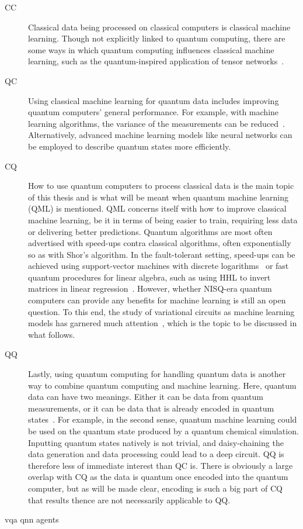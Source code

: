\begin{description}
    \item[CC]
        Classical data being processed on classical computers is classical machine learning.
        Though not explicitly linked to quantum computing, there are some ways in which quantum computing influences classical machine learning, such as the quantum-inspired application of tensor networks~\autocite{felser2021}.

    \item[QC]
        Using classical machine learning for quantum data includes improving quantum computers' general performance.
        For example, with machine learning algorithms, the variance of the measurements can be reduced~\autocite{torlai2020}.
        Alternatively, advanced machine learning models like neural networks can be employed to describe quantum states more efficiently.


    \item[CQ]
        How to use quantum computers to process classical data is the main topic of this thesis and is what will be meant when quantum machine learning (QML) is mentioned.
        QML concerns itself with how to improve classical machine learning, be it in terms of being easier to train, requiring less data or delivering better predictions.
        Quantum algorithms are most often advertised with speed-ups contra classical algorithms, often exponentially so as with Shor's algorithm.
        In the fault-tolerant setting, speed-ups can be achieved using support-vector machines with discrete logarithms~\autocite{liu2021} or fast quantum procedures for linear algebra, such as using HHL to invert matrices in linear regression~\autocite{wiebe2012}.
        However, whether NISQ-era quantum computers can provide any benefits for machine learning is still an open question.
        To this end, the study of variational circuits as machine learning models has garnered much attention~\autocite{benedetti2019}, which is the topic to be discussed in what follows.

    \item[QQ]
        Lastly, using quantum computing for handling quantum data is another way to combine quantum computing and machine learning.
        Here, quantum data can have two meanings.
        Either it can be data from quantum measurements, or it can be data that is already encoded in quantum states~\autocite{schuld2021a}.
        For example, in the second sense, quantum machine learning could be used on the quantum state produced by a quantum chemical simulation.
        Inputting quantum states natively is not trivial, and daisy-chaining the data generation and data processing could lead to a deep circuit.
        QQ is therefore less of immediate interest than QC is.
        There is obviously a large overlap with CQ as the data is quantum once encoded into the quantum computer, but as will be made clear, encoding is such a big part of CQ that results thence are not necessarily applicable to QQ.

\end{description}


{vqa}
{qnn}
{agents}